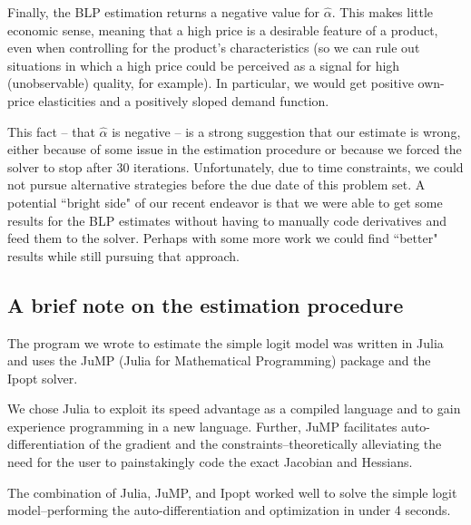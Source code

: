 \documentclass[a4paper,11pt]{article}
\begin{document}
Finally, the BLP estimation returns a negative value for $\hat\alpha$. This makes little economic sense, meaning that a high price is a desirable feature of a product, even when controlling for the product's characteristics (so we can rule out situations in which a high price could be perceived as a signal for high (unobservable) quality, for example). In particular, we would get positive own-price elasticities and a positively sloped demand function.

This fact -- that $\hat\alpha$ is negative -- is a strong suggestion that our estimate is wrong, either because of some issue in the estimation procedure or because we forced the solver to stop after 30 iterations. Unfortunately, due to time constraints, we could not pursue alternative strategies before the due date of this problem set. A potential ``bright side" of our recent endeavor is that we were able to get some results for the BLP estimates without having to manually code derivatives and feed them to the solver. Perhaps with some more work we could find ``better" results while still pursuing that approach.



\subsection*{A brief note on the estimation procedure}
The program we wrote to estimate the simple logit model was written in Julia and uses the JuMP (Julia for Mathematical Programming) package and the Ipopt solver.

We chose Julia to exploit its speed advantage as a compiled language and to gain experience programming in a new language. Further, JuMP facilitates auto-differentiation of the gradient and the constraints--theoretically alleviating the need for the user to painstakingly code the exact Jacobian and Hessians.

The combination of Julia, JuMP, and Ipopt worked well to solve the simple logit model--performing the auto-differentiation and optimization in under 4 seconds.
\end{document}
